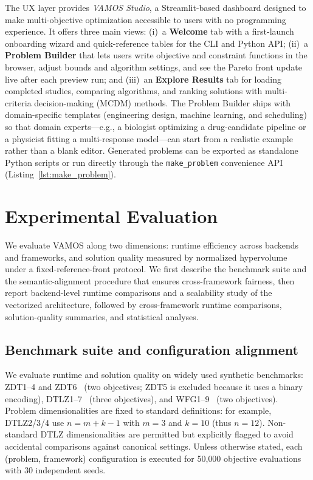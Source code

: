 \documentclass[journal]{IEEEtran}
\newcommand{\VAMOS}{VAMOS}
\begin{document}
The UX layer provides \emph{\VAMOS{} Studio}, a Streamlit-based dashboard designed to make multi-objective optimization accessible to users with no programming experience. It offers three main views: (i)~a \textbf{Welcome} tab with a first-launch onboarding wizard and quick-reference tables for the CLI and Python API; (ii)~a \textbf{Problem Builder} that lets users write objective and constraint functions in the browser, adjust bounds and algorithm settings, and see the Pareto front update live after each preview run; and (iii)~an \textbf{Explore Results} tab for loading completed studies, comparing algorithms, and ranking solutions with multi-criteria decision-making (MCDM) methods. The Problem Builder ships with domain-specific templates (engineering design, machine learning, and scheduling) so that domain experts---e.g., a biologist optimizing a drug-candidate pipeline or a physicist fitting a multi-response model---can start from a realistic example rather than a blank editor. Generated problems can be exported as standalone Python scripts or run directly through the \texttt{make\_problem} convenience API (Listing~\ref{lst:make_problem}).

\section{Experimental Evaluation}
\label{sec:experiments}

We evaluate \VAMOS{} along two dimensions: runtime efficiency across backends and frameworks, and solution quality measured by normalized hypervolume under a fixed-reference-front protocol. We first describe the benchmark suite and the semantic-alignment procedure that ensures cross-framework fairness, then report backend-level runtime comparisons and a scalability study of the vectorized architecture, followed by cross-framework runtime comparisons, solution-quality summaries, and statistical analyses.

\subsection{Benchmark suite and configuration alignment}

We evaluate runtime and solution quality on widely used synthetic benchmarks: ZDT1--4 and ZDT6~\cite{ZDT00} (two objectives; ZDT5 is excluded because it uses a binary encoding), DTLZ1--7~\cite{DTL+02} (three objectives), and WFG1--9~\cite{HHB+06} (two objectives). Problem dimensionalities are fixed to standard definitions: for example, DTLZ2/3/4 use $n = m + k - 1$ with $m=3$ and $k=10$ (thus $n=12$). Non-standard DTLZ dimensionalities are permitted but explicitly flagged to avoid accidental comparisons against canonical settings.
Unless otherwise stated, each (problem, framework) configuration is executed for 50{,}000 objective evaluations with 30 independent seeds.
\end{document}
